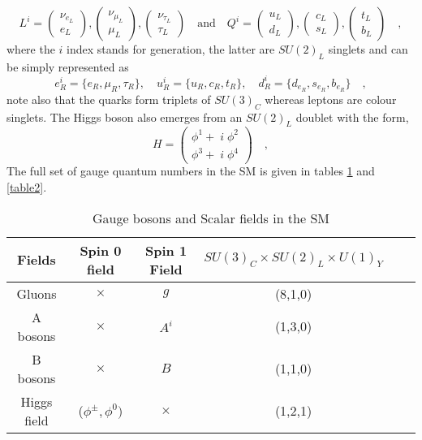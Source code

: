 \begin{equation}
L^i= \begin{pmatrix}
\nu_{e_L} \\ e_L 
\end{pmatrix},
\begin{pmatrix}
\nu_{\mu_L} \\ \mu_L 
\end{pmatrix},
\begin{pmatrix}
\nu_{\tau_L} \\ \tau_L 
\end{pmatrix} 
\quad 
\text{and} \quad Q^i= \begin{pmatrix}
u_{L} \\
d_L 
\end{pmatrix},\begin{pmatrix}
c_{L} \\
s_L 
\end{pmatrix}
,\begin{pmatrix}
t_{L} \\
b_L 
\end{pmatrix} \quad ,
\end{equation}
where the $i$ index stands for generation, the latter are $SU(2)_L$ singlets and can be simply represented as
%
 \begin{equation}
e^i_R=\{e_R,\mu_R,\tau_R\}, \quad  u^i_R=\{u_R,c_R,t_R\}, \quad d^i_R=\{d_{e_R},s_{e_R},b_{e_R}\} \quad , 
\end{equation}
%
note also that the quarks form triplets of $SU(3)_C$ whereas leptons are colour singlets. The Higgs boson also emerges from an $SU(2)_L$ doublet with the form,
%
\begin{equation}
H=\begin{pmatrix}
\phi^1 + \; i \; \phi^2 \\
\phi^3 + \; i \; \phi^4  
\end{pmatrix} \quad , 
\end{equation}
%
%
%
The full set of gauge quantum numbers in the SM is given in tables \ref{table1} and \ref{table2}. 
%
\begin{table}[ht]
\centering
\caption{Gauge bosons and Scalar fields in the SM}
\label{table1}
\begin{tabular}{@{}cccccc@{}}
  \hline	
 Fields & Spin 0 field & Spin 1 Field & $SU(3)_C \times SU(2)_L \times U(1)_Y$  \\
  \hline	
 Gluons  & $\times$  & $g$ & (8,1,0) \\	
A bosons & $\times$  & $A^i$ & (1,3,0)   \\
B bosons & $\times$  & $B$ & (1,1,0)   \\
Higgs field & ($\phi^\pm, \phi^0 )$  & $\times$ & (1,2,1) \\ \hline
\end{tabular}
\end{table}
